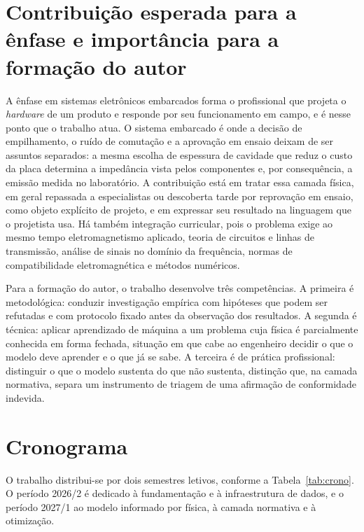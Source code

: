 \section{Contribuição esperada para a ênfase e importância para a formação do
autor}
\label{sec:contribuicao}

A ênfase em sistemas eletrônicos embarcados forma o profissional que projeta o
\textit{hardware} de um produto e responde por seu funcionamento em campo, e é nesse
ponto que o trabalho atua. O sistema embarcado é onde a decisão de empilhamento, o
ruído de comutação e a aprovação em ensaio deixam de ser assuntos separados: a mesma
escolha de espessura de cavidade que reduz o custo da placa determina a impedância
vista pelos componentes e, por consequência, a emissão medida no laboratório. A
contribuição está em tratar essa camada física, em geral repassada a especialistas
ou descoberta tarde por reprovação em ensaio, como objeto explícito de projeto, e em
expressar seu resultado na linguagem que o projetista usa. Há também integração
curricular, pois o problema exige ao mesmo tempo eletromagnetismo aplicado, teoria de
circuitos e linhas de transmissão, análise de sinais no domínio da frequência, normas
de compatibilidade eletromagnética e métodos numéricos.

Para a formação do autor, o trabalho desenvolve três competências. A primeira é
metodológica: conduzir investigação empírica com hipóteses que podem ser refutadas e
com protocolo fixado antes da observação dos resultados. A segunda é técnica: aplicar
aprendizado de máquina a um problema cuja física é parcialmente conhecida em forma
fechada, situação em que cabe ao engenheiro decidir o que o modelo deve aprender e o
que já se sabe. A terceira é de prática profissional: distinguir o que o modelo
sustenta do que não sustenta, distinção que, na camada normativa, separa um
instrumento de triagem de uma afirmação de conformidade indevida.

\section{Cronograma}
\label{sec:cronograma}

O trabalho distribui-se por dois semestres letivos, conforme a
Tabela~\ref{tab:crono}. O período 2026/2 é dedicado à fundamentação e à
infraestrutura de dados, e o período 2027/1 ao modelo informado por física, à camada
normativa e à otimização.

